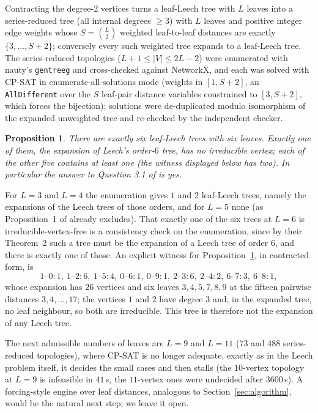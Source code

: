 \documentclass[11pt,a4paper]{article}
\theoremstyle{plain}
\newtheorem{proposition}[theorem]{Proposition}
\theoremstyle{remark}
\newcommand{\bin}[2]{\binom{#1}{#2}}
\begin{document}
Contracting the degree-$2$ vertices turns a leaf-Leech tree with $L$ leaves into
a series-reduced tree (all internal degrees $\ge 3$) with $L$ leaves and positive
integer edge weights whose $S=\bin L2$ weighted leaf-to-leaf distances are
exactly $\{3,\dots,S+2\}$; conversely every such weighted tree expands to a
leaf-Leech tree.  The series-reduced topologies ($L+1\le |V|\le 2L-2$) were
enumerated with nauty's \texttt{gentreeg} and cross-checked against NetworkX, and
each was solved with CP-SAT \cite{ORTools} in enumerate-all-solutions mode
(weights in $[1,S+2]$, an \texttt{AllDifferent} over the $S$ leaf-pair distance
variables constrained to $[3,S+2]$, which forces the bijection); solutions were
de-duplicated modulo isomorphism of the expanded unweighted tree and re-checked
by the independent checker.

\begin{proposition}\label{prop:leafleech}
There are exactly six leaf-Leech trees with six leaves.  Exactly one of them, the
expansion of Leech's order-$6$ tree, has no irreducible vertex; each of the
other five contains at least one (the witness displayed below has two).  In particular the answer to Question 3.1 of
\cite{OzenWangYalman2016} is yes.
\end{proposition}

For $L=3$ and $L=4$ the enumeration gives $1$ and $2$ leaf-Leech trees, namely
the expansions of the Leech trees of those orders, and for $L=5$ none (as
Proposition~1 of \cite{OzenWangYalman2016} already excludes).  That exactly one
of the six trees at $L=6$ is irreducible-vertex-free is a consistency check on
the enumeration, since by their Theorem~2 such a tree must be the expansion of a
Leech tree of order $6$, and there is exactly one of those.  An explicit witness
for Proposition~\ref{prop:leafleech}, in contracted form, is
\[
1\text{--}0{:}1,\ 1\text{--}2{:}6,\ 1\text{--}5{:}4,\ 0\text{--}6{:}1,\
0\text{--}9{:}1,\ 2\text{--}3{:}6,\ 2\text{--}4{:}2,\ 6\text{--}7{:}3,\
6\text{--}8{:}1 ,
\]
whose expansion has $26$ vertices and six leaves $3,4,5,7,8,9$ at the fifteen
pairwise distances $3,4,\dots,17$; the vertices $1$ and $2$ have degree $3$ and,
in the expanded tree, no leaf neighbour, so both are irreducible.  This tree is
therefore not the expansion of any Leech tree.

The next admissible numbers of leaves are $L=9$ and $L=11$ ($73$ and $488$
series-reduced topologies), where CP-SAT is no longer adequate, exactly as in
the Leech problem itself, it decides the small cases and then stalls (the
$10$-vertex topology at $L=9$ is infeasible in $41$\,s, the $11$-vertex ones were
undecided after $3600$\,s).  A forcing-style engine over leaf distances,
analogous to Section~\ref{sec:algorithm}, would be the natural next step; we
leave it open.
\end{document}
